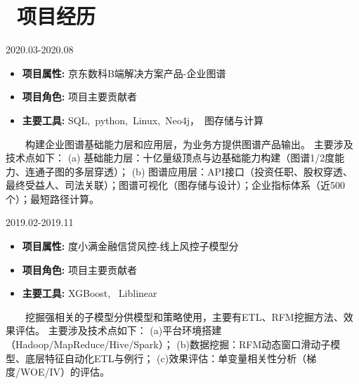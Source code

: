 \documentclass{resume}
\begin{document}
\medskip










\section{   \faUsers    \ 项目经历}


                      {2020.03-2020.08}

\begin{itemize}  [parsep=0.5ex]

  \item   \textbf{  项目属性:  }   {  京东数科B端解决方案产品-企业图谱  }                
  \item   \textbf{  项目角色:  }   {  项目主要贡献者  }
  \item   \textbf{  主要工具:  }   {  SQL,\ python,\ Linux,\ Neo4j，\ 图存储与计算 }

\end{itemize}


{    \ \ \ \ 构建企业图谱基础能力层和应用层，为业务方提供图谱产品输出。
主要涉及技术点如下：
(a) 基础能力层：十亿量级顶点与边基础能力构建（图谱1/2度能力、连通子图的多层穿透）；
(b) 图谱应用层：API接口（投资任职、股权穿透、最终受益人、司法关联）；图谱可视化（图存储与设计）；企业指标体系（近500个）；最短路径计算。 }

\medskip










                      {2019.02-2019.11}

\begin{itemize}  [parsep=0.5ex]

  \item   \textbf{  项目属性:  }   {  度小满金融信贷风控-线上风控子模型分  }                
  \item   \textbf{  项目角色:  }   {  项目主要贡献者  }
  \item   \textbf{  主要工具:  }   {  XGBoost, \ Liblinear  }

\end{itemize}


{    \ \ \ \ 挖掘强相关的子模型分供模型和策略使用，主要有ETL、RFM挖掘方法、效果评估。
主要涉及技术点如下：
(a)平台环境搭建（Hadoop/MapReduce/Hive/Spark）；
(b)数据挖掘：RFM动态窗口滑动子模型、底层特征自动化ETL与例行；
(c)效果评估：单变量相关性分析（梯度/WOE/IV）的评估。}
\end{document}
